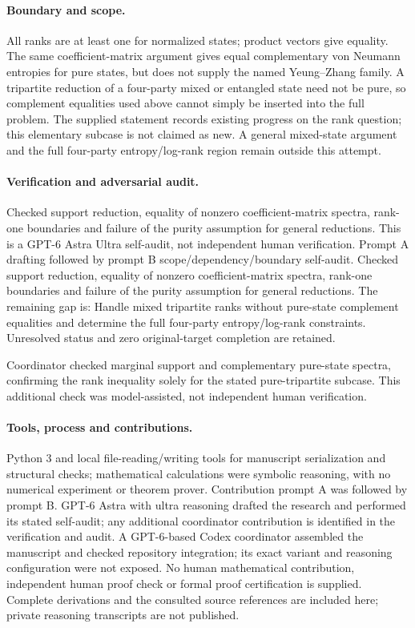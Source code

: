 \documentclass[11pt]{article}
\begin{document}
\paragraph{Boundary and scope.} All ranks are at least one for normalized states; product vectors give equality. The same coefficient-matrix argument gives equal complementary von Neumann entropies for pure states, but does not supply the named Yeung--Zhang family. A tripartite reduction of a four-party mixed or entangled state need not be pure, so complement equalities used above cannot simply be inserted into the full problem. The supplied statement records existing progress on the rank question; this elementary subcase is not claimed as new. A general mixed-state argument and the full four-party entropy/log-rank region remain outside this attempt.

\paragraph{Verification and adversarial audit.}
Checked support reduction, equality of nonzero coefficient-matrix spectra, rank-one boundaries and failure of the purity assumption for general reductions. This is a GPT-6 Astra Ultra self-audit, not independent human verification. Prompt A drafting followed by prompt B scope/dependency/boundary self-audit. Checked support reduction, equality of nonzero coefficient-matrix spectra, rank-one boundaries and failure of the purity assumption for general reductions. The remaining gap is: Handle mixed tripartite ranks without pure-state complement equalities and determine the full four-party entropy/log-rank constraints. Unresolved status and zero original-target completion are retained.

Coordinator checked marginal support and complementary pure-state spectra, confirming the rank inequality solely for the stated pure-tripartite subcase. This additional check was model-assisted, not independent human verification.

\paragraph{Tools, process and contributions.}
Python 3 and local file-reading/writing tools for manuscript serialization and structural checks; mathematical calculations were symbolic reasoning, with no numerical experiment or theorem prover. Contribution prompt A was followed by prompt B. GPT-6 Astra with ultra reasoning drafted the research and performed its stated self-audit; any additional coordinator contribution is identified in the verification and audit. A GPT-6-based Codex coordinator assembled the manuscript and checked repository integration; its exact variant and reasoning configuration were not exposed. No human mathematical contribution, independent human proof check or formal proof certification is supplied. Complete derivations and the consulted source references are included here; private reasoning transcripts are not published.
\end{document}
